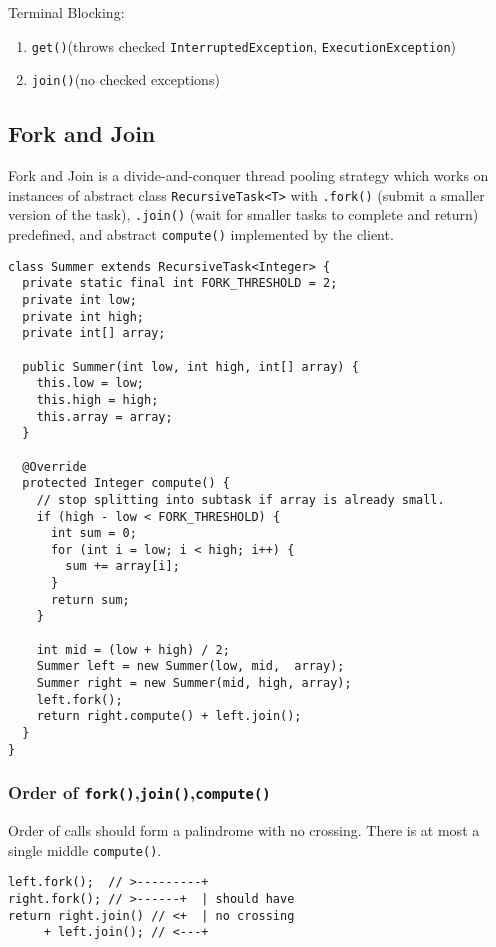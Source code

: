 \documentclass[12pt, a4paper]{article}
\begin{document}
\begin{multicols*}{3}
Terminal Blocking:
\begin{enumerate}[\roman*.]
  \item \lstinline|get()|\hfill(throws checked \lstinline|InterruptedException|, \lstinline|ExecutionException|)
  \item \lstinline|join()|\hfill(no checked exceptions)
\end{enumerate}

\subsection{Fork and Join}
Fork and Join is a divide-and-conquer thread pooling strategy which works on instances of abstract class \lstinline|RecursiveTask<T>| with \lstinline|.fork()| (submit a smaller version of the task), \lstinline|.join()| (wait for smaller tasks to complete and return) predefined, and abstract \lstinline|compute()| implemented by the client.

\begin{lstlisting}
class Summer extends RecursiveTask<Integer> {
  private static final int FORK_THRESHOLD = 2;
  private int low;
  private int high;
  private int[] array;

  public Summer(int low, int high, int[] array) {
    this.low = low;
    this.high = high;
    this.array = array;
  }

  @Override
  protected Integer compute() {
    // stop splitting into subtask if array is already small.
    if (high - low < FORK_THRESHOLD) {
      int sum = 0;
      for (int i = low; i < high; i++) {
        sum += array[i];
      }
      return sum;
    }

    int mid = (low + high) / 2;
    Summer left = new Summer(low, mid,  array);
    Summer right = new Summer(mid, high, array);
    left.fork();
    return right.compute() + left.join();
  }
}
\end{lstlisting}

\subsubsection{Order of \lstinline|fork()|,\lstinline|join()|,\lstinline|compute()|}
Order of calls should form a palindrome with no crossing. There is at most a single middle \lstinline|compute()|.
\begin{lstlisting}
left.fork();  // >---------+
right.fork(); // >------+  | should have
return right.join() // <+  | no crossing
     + left.join(); // <---+
\end{lstlisting}


\end{multicols*}
\end{document}
